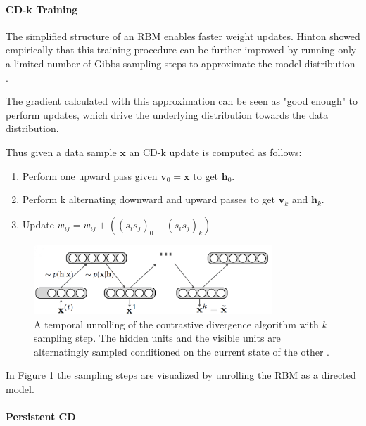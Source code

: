 \paragraph{CD-k Training} \label{c:cdk}

The simplified structure of an RBM enables faster weight updates. 
Hinton showed empirically that this training procedure can be further improved by running only a limited number of Gibbs sampling steps to approximate the model distribution \cite{hinton2002training}.

The gradient calculated with this approximation can be seen as "good enough" to perform updates, which drive the underlying distribution towards the data distribution.

Thus given a data sample $\textbf{x}$ an CD-k update is computed as follows:
\begin{enumerate}
\item Perform one upward pass given $\textbf{v}_0=\textbf{x}$ to get $\textbf{h}_0$.
\item Perform k alternating downward and upward passes to get $\textbf{v}_k$ and $\textbf{h}_k$.
\item Update $w_{ij} = w_{ij} + ( (s_i s_j)_0 - (s_i s_j)_k ) $ 
\end{enumerate} 

\begin{figure}
	\centering
    	\includegraphics[width=0.8\textwidth]{imgs/cd.png} 
    \caption[A temporal unrolling of the contrastive divergence algorithm.]{A temporal unrolling of the contrastive divergence algorithm with $k$ sampling step. The hidden units and the visible units are alternatingly sampled conditioned on the current state of the other \cite{cdImg}.}
	\label{fig:cd}
\end{figure}

In Figure \ref{fig:cd} the sampling steps are visualized by unrolling the RBM as a directed model.

\paragraph{Persistent CD} \label{c:pcd}

